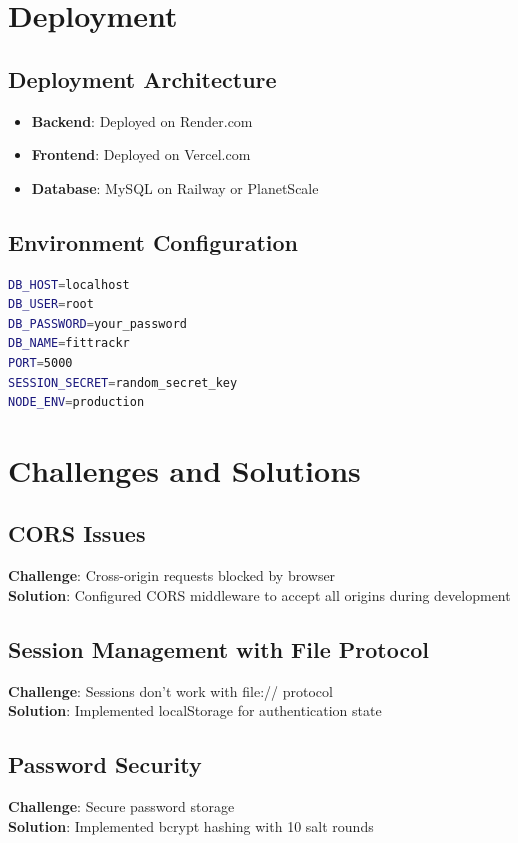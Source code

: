 \documentclass[12pt,a4paper]{article}
\begin{document}
\section{Deployment}

\subsection{Deployment Architecture}
\begin{itemize}
    \item \textbf{Backend}: Deployed on Render.com
    \item \textbf{Frontend}: Deployed on Vercel.com
    \item \textbf{Database}: MySQL on Railway or PlanetScale
\end{itemize}

\subsection{Environment Configuration}
\begin{lstlisting}[language=bash]
DB_HOST=localhost
DB_USER=root
DB_PASSWORD=your_password
DB_NAME=fittrackr
PORT=5000
SESSION_SECRET=random_secret_key
NODE_ENV=production
\end{lstlisting}

\section{Challenges and Solutions}

\subsection{CORS Issues}
\textbf{Challenge}: Cross-origin requests blocked by browser \\
\textbf{Solution}: Configured CORS middleware to accept all origins during development

\subsection{Session Management with File Protocol}
\textbf{Challenge}: Sessions don't work with file:// protocol \\
\textbf{Solution}: Implemented localStorage for authentication state

\subsection{Password Security}
\textbf{Challenge}: Secure password storage \\
\textbf{Solution}: Implemented bcrypt hashing with 10 salt rounds
\end{document}
